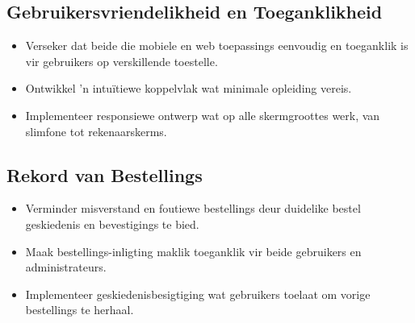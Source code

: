 \subsection{Gebruikersvriendelikheid en Toeganklikheid}
\begin{itemize}
  \item Verseker dat beide die mobiele en web toepassings eenvoudig en toeganklik is vir gebruikers op verskillende toestelle.
  \item Ontwikkel 'n intuïtiewe koppelvlak wat minimale opleiding vereis.
  \item Implementeer responsiewe ontwerp wat op alle skermgroottes werk, van slimfone tot rekenaarskerms.
\end{itemize}

\subsection{Rekord van Bestellings}
\begin{itemize}
  \item Verminder misverstand en foutiewe bestellings deur duidelike bestel geskiedenis en bevestigings te bied.
  \item Maak bestellings-inligting maklik toeganklik vir beide gebruikers en administrateurs.
  \item Implementeer geskiedenisbesigtiging wat gebruikers toelaat om vorige bestellings te herhaal.
\end{itemize}
